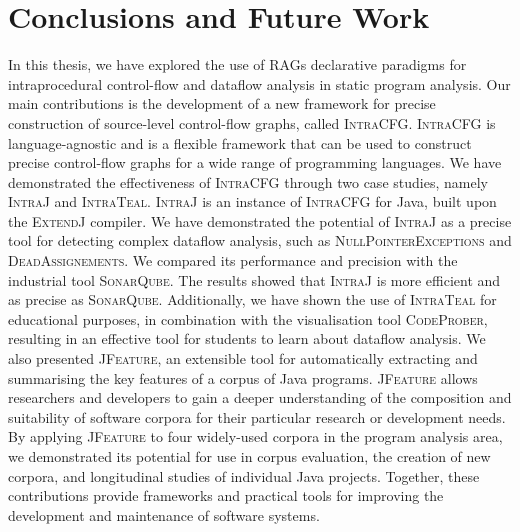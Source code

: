 \section{Conclusions and Future Work}%
\label{sec:kappa:conclusions}%
In this thesis, we have explored the use of RAGs declarative paradigms for
intraprocedural control-flow and dataflow analysis in static program analysis. Our main contributions is the
development of a new framework for precise construction of source-level
control-flow graphs, called \textsc{IntraCFG}.
\textsc{IntraCFG} is language-agnostic and is a flexible framework that can be used to
construct precise control-flow graphs for a wide range of programming languages.
We have demonstrated the effectiveness of \textsc{IntraCFG} through two case studies,
namely \textsc{IntraJ} and \textsc{IntraTeal}.
\textsc{IntraJ} is an instance of \textsc{IntraCFG} for Java, 
built upon the \textsc{ExtendJ} compiler.
We have demonstrated the potential of \textsc{IntraJ} as a precise tool
for detecting complex dataflow analysis, such as \textsc{NullPointerExceptions} and \textsc{DeadAssignements}.
We compared its performance and precision with the industrial tool \textsc{SonarQube}. 
The results showed that \textsc{IntraJ} is more efficient and as precise as \textsc{SonarQube}.
Additionally, we have shown the use of \textsc{IntraTeal}
for educational purposes, in combination with the visualisation tool \textsc{CodeProber},
resulting in an effective tool for students to learn about dataflow analysis.
We also presented  \textsc{JFeature}, an extensible tool for automatically
extracting and summarising the key features of a corpus of Java programs.
\textsc{JFeature} allows researchers and developers to gain a deeper understanding of the composition and
suitability of software corpora for their particular research or development needs.
By applying \textsc{JFeature} to four widely-used corpora in the program analysis area,
we demonstrated its potential for use in corpus evaluation, the creation of new
corpora, and longitudinal studies of individual Java projects.
Together, these contributions provide frameworks and practical tools
for improving the development and maintenance of software systems.


